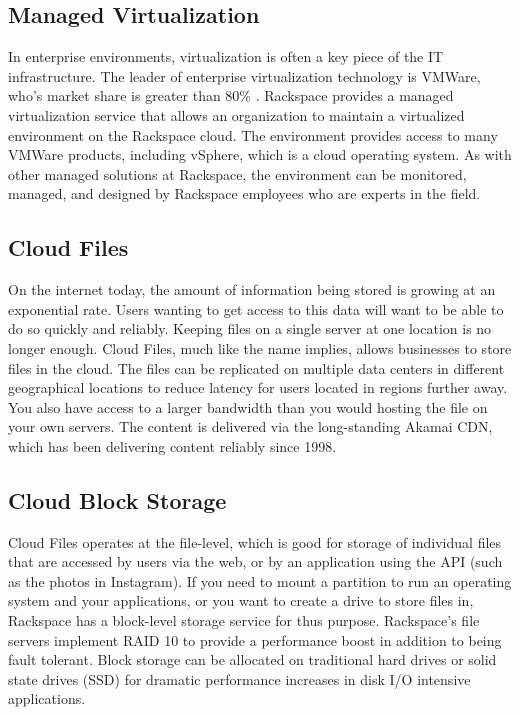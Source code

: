 \documentclass[DIV=calc, paper=letter, fontsize=12pt, twocolumn]{scrartcl}	 %
\begin{document}
\subsection*{Managed Virtualization}

In enterprise environments, virtualization is often a key piece of the IT
infrastructure. The leader of enterprise virtualization technology is 
VMWare, who's market share is greater than 80\% \cite{ref:vmware}. Rackspace
provides a managed virtualization service that allows an organization to
maintain a virtualized environment on the Rackspace cloud. The environment 
provides access to many VMWare products, including vSphere, which is a
cloud operating system. As with other managed solutions at Rackspace, 
the environment can be monitored, managed, and designed by Rackspace 
employees who are experts in the field.

\subsection*{Cloud Files}

On the internet today, the amount of information being stored is growing
at an exponential rate. Users wanting to get access to this data will
want to be able to do so quickly and reliably. Keeping files on a single
server at one location is no longer enough. Cloud Files, much like the
name implies, allows businesses to store files in the cloud. The files
can be replicated on multiple data centers in different geographical
locations to reduce latency for users located in regions further away.
You also have access to a larger bandwidth than you would hosting
the file on your own servers. The content is delivered via the long-standing
Akamai CDN, which has been delivering content reliably since 1998.

\subsection*{Cloud Block Storage}

Cloud Files operates at the file-level, which is good for storage of
individual files that are accessed by users via the web, or by an
application using the API (such as the photos in Instagram). If you need to
mount a partition to run an operating system and your applications, 
or you want to create a drive to store files in, Rackspace has a block-level
storage service for thus purpose. Rackspace's file servers implement RAID
10 to provide a performance boost in addition to being fault tolerant.
Block storage can be allocated on traditional hard drives or solid state
drives (SSD) for dramatic performance increases in disk I/O intensive
applications.
\end{document}
